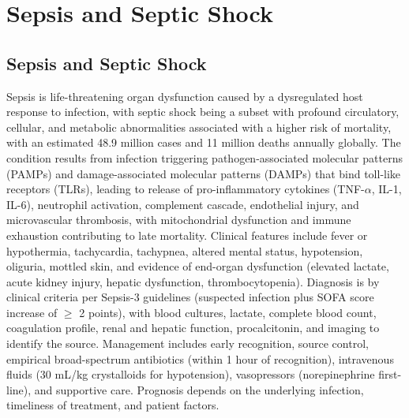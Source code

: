 \section{Sepsis and Septic Shock}








\label{sec:section:Sepsis and Septic Shock}

\subsection{Sepsis and Septic Shock}
\label{sec:Sepsis and Septic Shock}
Sepsis is life-threatening organ dysfunction caused by a dysregulated host response to infection, with septic shock being a subset with profound circulatory, cellular, and metabolic abnormalities associated with a higher risk of mortality, with an estimated 48.9 million cases and 11 million deaths annually globally. The condition results from infection triggering pathogen-associated molecular patterns (PAMPs) and damage-associated molecular patterns (DAMPs) that bind toll-like receptors (TLRs), leading to release of pro-inflammatory cytokines (TNF-$\alpha$, IL-1, IL-6), neutrophil activation, complement cascade, endothelial injury, and microvascular thrombosis, with mitochondrial dysfunction and immune exhaustion contributing to late mortality. Clinical features include fever or hypothermia, tachycardia, tachypnea, altered mental status, hypotension, oliguria, mottled skin, and evidence of end-organ dysfunction (elevated lactate, acute kidney injury, hepatic dysfunction, thrombocytopenia). Diagnosis is by clinical criteria per Sepsis-3 guidelines (suspected infection plus SOFA score increase of $\ge$ 2 points), with blood cultures, lactate, complete blood count, coagulation profile, renal and hepatic function, procalcitonin, and imaging to identify the source. Management includes early recognition, source control, empirical broad-spectrum antibiotics (within 1 hour of recognition), intravenous fluids (30 mL/kg crystalloids for hypotension), vasopressors (norepinephrine first-line), and supportive care. Prognosis depends on the underlying infection, timeliness of treatment, and patient factors.

